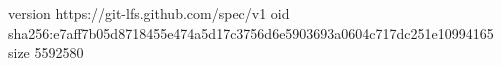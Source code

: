 version https://git-lfs.github.com/spec/v1
oid sha256:e7aff7b05d8718455e474a5d17c3756d6e5903693a0604c717dc251e10994165
size 5592580
